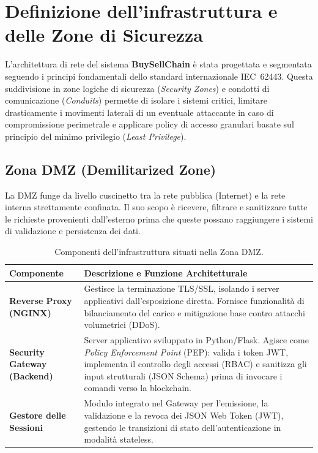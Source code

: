 \chapter{Definizione dell'infrastruttura e delle Zone di Sicurezza}

L'architettura di rete del sistema \textbf{BuySellChain} è stata progettata e segmentata seguendo i principi fondamentali dello standard internazionale IEC~62443. Questa suddivisione in zone logiche di sicurezza (\textit{Security Zones}) e condotti di comunicazione (\textit{Conduits}) permette di isolare i sistemi critici, limitare drasticamente i movimenti laterali di un eventuale attaccante in caso di compromissione perimetrale e applicare policy di accesso granulari basate sul principio del minimo privilegio (\textit{Least Privilege}).

\section{Zona DMZ (Demilitarized Zone)}

La DMZ funge da livello cuscinetto tra la rete pubblica (Internet) e la rete interna strettamente confinata. Il suo scopo è ricevere, filtrare e sanitizzare tutte le richieste provenienti dall'esterno prima che queste possano raggiungere i sistemi di validazione e persistenza dei dati.

\begin{table}[h]
\centering
\small
\renewcommand{\arraystretch}{1.4}
\begin{tabularx}{\textwidth}{>{\bfseries}p{3.5cm} X}
\toprule
\textbf{Componente} & \textbf{Descrizione e Funzione Architetturale} \\
\midrule
Reverse Proxy (NGINX) &
    Gestisce la terminazione TLS/SSL, isolando i server applicativi dall'esposizione diretta.
    Fornisce funzionalità di bilanciamento del carico e mitigazione base contro attacchi
    volumetrici (DDoS). \\[4pt]
Security Gateway (Backend) &
    Server applicativo sviluppato in Python/Flask. Agisce come \textit{Policy Enforcement Point}
    (PEP): valida i token JWT, implementa il controllo degli accessi (RBAC) e sanitizza gli
    input strutturali (JSON Schema) prima di invocare i comandi verso la blockchain. \\[4pt]
Gestore delle Sessioni &
    Modulo integrato nel Gateway per l'emissione, la validazione e la revoca dei JSON Web
    Token (JWT), gestendo le transizioni di stato dell'autenticazione in modalità stateless. \\
\bottomrule
\end{tabularx}
\caption{Componenti dell'infrastruttura situati nella Zona DMZ.}
\label{tab:dmz}
\end{table}

